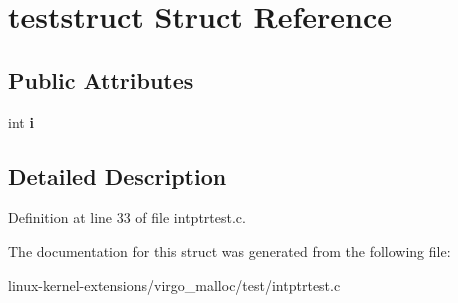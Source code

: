 \hypertarget{structteststruct}{\section{teststruct Struct Reference}
\label{structteststruct}
}
\subsection*{Public Attributes}
\begin{DoxyCompactItemize}
\item 
\hypertarget{structteststruct_adba8650444c5a65c6d19087107fd06a5}{int {\bfseries i}}\label{structteststruct_adba8650444c5a65c6d19087107fd06a5}

\end{DoxyCompactItemize}


\subsection{Detailed Description}


Definition at line 33 of file intptrtest.\-c.



The documentation for this struct was generated from the following file\-:\begin{DoxyCompactItemize}
\item 
linux-\/kernel-\/extensions/virgo\-\_\-malloc/test/intptrtest.\-c\end{DoxyCompactItemize}
